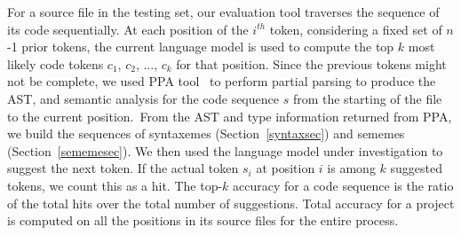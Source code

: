 For a source file in the testing set, our evaluation tool traverses
the sequence of its code sequentially. At each position of the
$i^{th}$ token, considering a fixed set of $n$-1 prior tokens, the
current language model is used to compute the top $k$ most likely code
tokens $c_1$, $c_2$, ..., $c_k$ for that position.
%
Since the previous tokens might not be complete, we used PPA
tool~\cite{ppa08} to perform partial parsing to produce the AST, and
semantic analysis for the code sequence $s$ from the starting of the
file to the current position.~From the AST and type information
returned from PPA, we build the sequences of syntaxemes
(Section~\ref{syntaxsec}) and sememes (Section~\ref{sememesec}). 
%
We then used the language model under investigation to suggest the
next token. If the actual token $s_i$ at position $i$ is among $k$
suggested tokens, we count this as a hit. The top-$k$ accuracy for
a code sequence is the ratio of the total hits over the total number
of suggestions. Total accuracy for a project is computed on all the
positions in its source files for the entire process.








